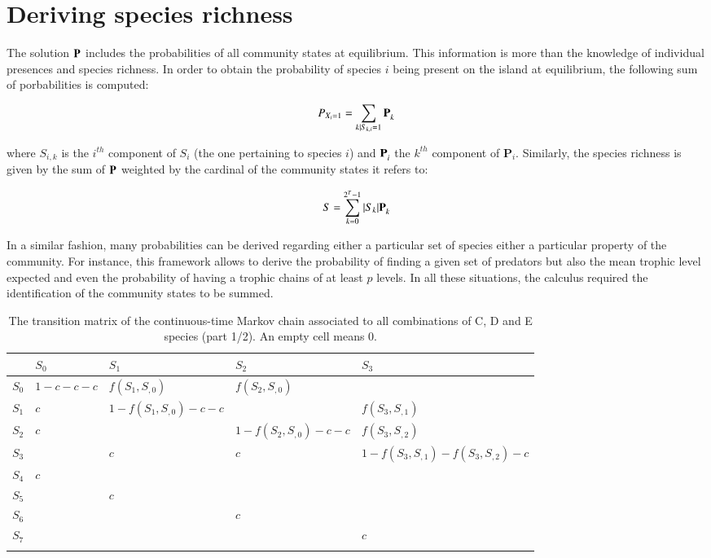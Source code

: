 \section{Deriving species richness}\label{deriving-species-richness}

The solution \(\mathbf{P}^{\*}\) includes the probabilities of all
community states at equilibrium. This information is more than
the knowledge of individual presences and species richness.
In order to obtain the probability of species $i$ being present on the island
at equilibrium, the following sum of porbabilities is computed:

\begin{equation}
P_{X_i=1} = \sum_{k \mid S_{k,i}=1} \mathbf{P}_{k}^{\*}
\end{equation}

where \(S_{i,k}\) is the \(i^{th}\) component of \(S_i\) (the one
pertaining to species \(i\)) and \(\mathbf{P}_{i}^{\*}\) the \(k^{th}\)
component of \(\mathbf{P}_{i}\). Similarly, the species richness is
given by the sum of \(\mathbf{P}^{\*}\) weighted by the cardinal of the
community states it refers to:

\begin{equation}
S= \sum_{k=0}^{2^T-1} |S_k|\mathbf{P}_{k}^{\*}
\end{equation}

In a similar fashion, many probabilities can be derived regarding either
a particular set of species either a particular property of the
community. For instance, this framework allows to derive the probability
of finding a given set of predators but also the mean trophic level
expected and even the probability of having a trophic chains of at least
\(p\) levels. In all these situations, the calculus required the
identification of the community states to be summed.


\newpage

\begin{landscape}

  \begin{longtable}[]{@{}lllll@{}}
  \caption[Transition matrix of the continuous-time Markov chain (part 1/2)]{The transition matrix of the continuous-time Markov chain
  associated to all combinations of C, D and E species (part 1/2). An empty cell means 0. }\tabularnewline
  \toprule
  & \(S_{0}\) & \(S_{1}\) & \(S_{2}\) & \(S_{3}\)\tabularnewline
  \midrule
  \endhead
  \(S_{0}\) & \(1-c-c-c\) & \(f(S_{1},S_{,0})\) & \(f(S_{2},S_{,0})\)
  &\tabularnewline
  \(S_{1}\) & \(c\) & \(1-f(S_{1},S_{,0})-c-c\) & &
  \(f(S_{3},S_{,1})\)\tabularnewline
  \(S_{2}\) & \(c\) & & \(1-f(S_{2},S_{,0})-c-c\) &
  \(f(S_{3},S_{,2})\)\tabularnewline
  \(S_{3}\) & & \(c\) & \(c\) &
  \(1-f(S_{3},S_{,1})-f(S_{3},S_{,2})-c\)\tabularnewline
  \(S_{4}\) & \(c\) & & &\tabularnewline
  \(S_{5}\) & & \(c\) & &\tabularnewline
  \(S_{6}\) & & & \(c\) &\tabularnewline
  \(S_{7}\) & & & & \(c\)\tabularnewline
  \bottomrule
  \label{tabAnnIII_3}
  \end{longtable}

\end{landscape}



